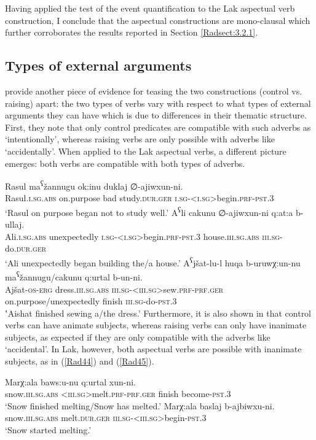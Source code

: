 \documentclass[output=paper]{langscibook}
\begin{document}
Having applied the test of the event quantification to the Lak aspectual verb construction, I conclude that the aspectual constructions are mono-clausal which further corroborates the results reported in Section \ref{Radsect:3.2.1}.

\subsection{Types of external arguments}
\citet{PolinskyPotsdam2002}  provide another piece of evidence for teasing the two constructions (control vs. raising) apart: the two types of verbs vary with respect to what types of external arguments they can have which is due to differences in their thematic structure. First, they note that only control predicates are compatible with such adverbs as ‘intentionally’, whereas raising verbs are only possible with adverbs like ‘accidentally’. When applied to the Lak aspectual verbs, a different picture emerges: both verbs are compatible with both types of adverbs.

\ea\label{Rad41}
\gll Rasul ma\textsuperscript{ʕ}žannugu ok:inu duklaj	∅-ajiwxun-ni.\\
Rasul.\textsc{i.sg.abs} on.purpose bad study.\textsc{dur.ger} \textsc{i.sg-<i.sg>}begin.\textsc{prf-pst.3}\\
\glt ‘Rasul on purpose began not to study well.’
\ex\label{Rad42}
\gll A\textsuperscript{ʕ}li cakunu ∅-ajiwxun-ni q:at:a b-ullaj.\\
Ali.\textsc{i.sg.abs} unexpectedly \textsc{i.sg-<i.sg>}begin.\textsc{prf-pst.3} house.\textsc{iii.sg.abs} \textsc{iii.sg}-do.\textsc{dur.ger}\\
\glt ‘Ali unexpectedly began building the/a house.’
\ex\label{Rad43}
\gll A\textsuperscript{ʕ}jšat-lu-l huqa b-uruwχ:un-nu ma\textsuperscript{ʕ}žannugu/cakunu q:urtal b-un-ni.\\
Ajšat-\textsc{os-erg} 	dress.\textsc{iii.sg.abs} \textsc{iii.sg-<iii.sg>}sew.\textsc{prf-prf.ger} on.purpose/unexpectedly	finish 	\textsc{iii.sg}-do-\textsc{pst.3}\\	
\glt ‛Aishat finished sewing a/the dress.’
\z 
Furthermore, it is also shown in \citet{PolinskyPotsdam2002} that control verbs can have animate subjects, whereas raising verbs can only have inanimate subjects, as expected if they are only compatible with the adverbs like ‘accidental’. In Lak, however, both aspectual verbs are possible with inanimate subjects, as in (\ref{Rad44}) and (\ref{Rad45}).   

\ea\label{Rad44}
\gll Marχ:ala baws:u-nu q:urtal xun-ni.\\
snow.\textsc{iii.sg.abs} \textsc{<iii.sg>}melt.\textsc{prf-prf.ger} finish become-\textsc{pst.3}\\
\glt ‘Snow finished melting/Snow has melted.’
\ex\label{Rad45}
\gll Marχ:ala baslaj b-ajbiwxu-ni.\\
snow.\textsc{iii.sg.abs} melt.\textsc{dur.ger} \textsc{iii.sg-<iii.sg>}begin-\textsc{pst.3}\\
\glt ‘Snow started melting.’
\z 
\end{document}
